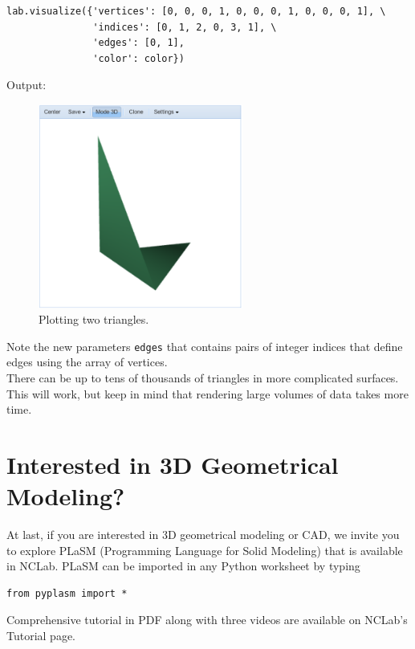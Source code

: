 \documentclass[article,A4,12pt]{llncs}
\begin{document}
\begin{verbatim}
lab.visualize({'vertices': [0, 0, 0, 1, 0, 0, 0, 1, 0, 0, 0, 1], \
               'indices': [0, 1, 2, 0, 3, 1], \
               'edges': [0, 1],
               'color': color})
\end{verbatim}
Output:
\newpage
\begin{figure}[!ht]
\begin{center}
\includegraphics[width=0.6\textwidth]{img/tria3.png}
\end{center}
\vspace{-2mm}
\caption{Plotting two triangles.}
\label{fig:tria3}
\end{figure}
\noindent
Note the new parameters {\tt edges} that contains pairs of integer indices
that define edges using the array of vertices.\\

\noindent
There can be up to tens of thousands of triangles in more complicated surfaces.
This will work, but keep in mind that rendering large volumes of data takes
more time.

\section{Interested in 3D Geometrical Modeling?}
At last, if you are interested in 3D geometrical modeling or CAD, we invite you to 
explore PLaSM (Programming Language for Solid Modeling) that is available in 
NCLab. PLaSM can be imported in any Python worksheet by typing 

\begin{verbatim}
from pyplasm import *
\end{verbatim}
Comprehensive tutorial in PDF along with three videos are available on NCLab's
Tutorial page.
\end{document}
